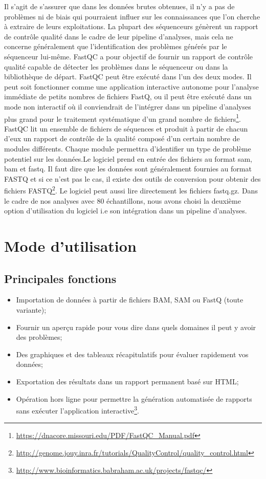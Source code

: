 \documentclass[a4paper,11pt]{article}
\begin{document}
Il s'agit de s'assurer que dans les données brutes obtenues, il n'y a
pas de problèmes ni de biais qui pourraient influer sur les
connaissances que l'on cherche à extraire de leurs exploitations. La
plupart des séquenceurs génèrent un rapport de contrôle qualité dans
le cadre de leur pipeline d’analyses, mais cela ne concerne
généralement que l’identification des problèmes générés par le
séquenceur lui-même.  FastQC a pour objectif de fournir un rapport de
contrôle qualité capable de détecter les problèmes dans le séquenceur
ou dans la bibliothèque de départ. FastQC peut être exécuté dans l'un
des deux modes. Il peut soit fonctionner comme une application
interactive autonome pour l’analyse immédiate de petits nombres de
fichiers FastQ, ou il peut être exécuté dans un mode non interactif où
il conviendrait de l’intégrer dans un pipeline d’analyses plus grand
pour le traitement systématique d’un grand nombre de
fichiers\footnote{\url{https://dnacore.missouri.edu/PDF/FastQC_Manual.pdf}}.
FastQC lit un ensemble de fichiers de séquences et produit à partir de
chacun d'eux un rapport de contrôle de la qualité composé d'un certain
nombre de modules différents. Chaque module permettra d'identifier un
type de problème potentiel sur les données.Le logiciel prend en entrée
des fichiers au format sam, bam et fastq. Il faut dire que les données
sont généralement fournies au format FASTQ et si ce n'est pas le cas,
il existe des outils de conversion pour obtenir des fichiers
FASTQ\footnote{\url{http://genome.jouy.inra.fr/tutorials/QualityControl/quality_control.html}}. Le
logiciel peut aussi lire directement les fichiers fastq.gz.  Dans le
cadre de nos analyses avec 80 échantillons, nous avons choisi la
deuxième option d'utilisation du logiciel i.e son intégration dans un
pipeline d'analyses.

\section{Mode d'utilisation}

\subsection{Principales fonctions}

\begin{itemize}
\item Importation de données à partir de fichiers BAM, SAM ou FastQ
  (toute variante);
\item Fournir un aperçu rapide pour vous dire dans quels domaines il
  peut y avoir des problèmes;
\item Des graphiques et des tableaux récapitulatifs pour évaluer
  rapidement vos données;
\item Exportation des résultats dans un rapport permanent basé sur
  HTML;
\item Opération hors ligne pour permettre la génération automatisée de
  rapports sans exécuter l'application
  interactive\footnote{\url{http://www.bioinformatics.babraham.ac.uk/projects/fastqc/}}.
\end{itemize}
\end{document}
